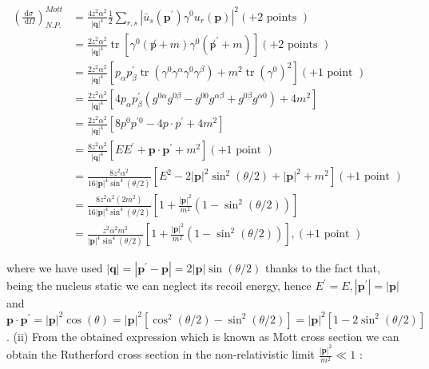 \documentclass[10pt, letterpaper]{article}
\begin{document}
$$
\begin{aligned}
\left(\frac{\mathrm{d} \sigma}{\mathrm{~d} \Omega}\right)_{N . P .}^{M o t t} & =\frac{4 z^2 \alpha^2}{|\mathbf{q}|^4} \frac{1}{2} \sum_{r, s}\left|\bar{u}_s\left(\mathbf{p}^{\prime}\right) \gamma^0 u_r(\mathbf{p})\right|^2(+2 \text { points }) \\
& =\frac{2 z^2 \alpha^2}{|\mathbf{q}|^4} \operatorname{tr}\left[\gamma^0(\not p+m) \gamma^0\left(\not p^{\prime}+m\right)\right](+2 \text { points }) \\
& =\frac{2 z^2 \alpha^2}{|\mathbf{q}|^4}\left[p_\alpha p_\beta^{\prime} \operatorname{tr}\left(\gamma^0 \gamma^\alpha \gamma^0 \gamma^\beta\right)+m^2 \operatorname{tr}\left(\gamma^0\right)^2\right](+1 \text { point }) \\
& =\frac{2 z^2 \alpha^2}{|\mathbf{q}|^4}\left[4 p_\alpha p_\beta^{\prime}\left(g^{0 \alpha} g^{0 \beta}-g^{00} g^{\alpha \beta}+g^{0 \beta} g^{\alpha 0}\right)+4 m^2\right] \\
& =\frac{2 z^2 \alpha^2}{|\mathbf{q}|^4}\left[8 p^0 p^{\prime 0}-4 p \cdot p^{\prime}+4 m^2\right] \\
& =\frac{8 z^2 \alpha^2}{|\mathbf{q}|^4}\left[E E^{\prime}+\mathbf{p} \cdot \mathbf{p}^{\prime}+m^2\right](+1 \text { point }) \\
& =\frac{8 z^2 \alpha^2}{16|\mathbf{p}|^4 \sin ^4(\theta / 2)}\left[E^2-2|\mathbf{p}|^2 \sin ^2(\theta / 2)+|\mathbf{p}|^2+m^2\right](+1 \text { point }) \\
& =\frac{8 z^2 \alpha^2\left(2 m^2\right)}{16|\mathbf{p}|^4 \sin ^4(\theta / 2)}\left[1+\frac{|\mathbf{p}|^2}{m^2}\left(1-\sin ^2(\theta / 2)\right)\right] \\
& =\frac{z^2 \alpha^2 m^2}{|\mathbf{p}|^4 \sin ^4(\theta / 2)}\left[1+\frac{|\mathbf{p}|^2}{m^2}\left(1-\sin ^2(\theta / 2)\right)\right],(+1 \text { point })
\end{aligned}
$$

where we have used $|\mathbf{q}|=\left|\mathbf{p}^{\prime}-\mathbf{p}\right|=2|\mathbf{p}| \sin (\theta / 2)$ thanks to the fact that, being the nucleus static we can neglect its recoil energy, hence $E^{\prime}=E,\left|\mathbf{p}^{\prime}\right|=|\mathbf{p}|$ and $\mathbf{p} \cdot \mathbf{p}^{\prime}=|\mathbf{p}|^2 \cos (\theta)=|\mathbf{p}|^2\left[\cos ^2(\theta / 2)-\sin ^2(\theta / 2)\right]=|\mathbf{p}|^2\left[1-2 \sin ^2(\theta / 2)\right]$.
(ii) From the obtained expression which is known as Mott cross section we can obtain the Rutherford cross section in the non-relativistic limit $\frac{|\mathbf{p}|^2}{m^2} \ll 1$ :
\end{document}
